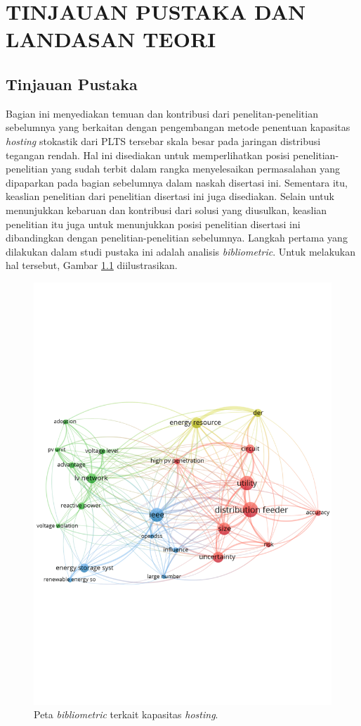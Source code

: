 \chapter{TINJAUAN PUSTAKA DAN LANDASAN TEORI}
\label{bab-tinjauan}
\section{Tinjauan Pustaka}
Bagian ini menyediakan temuan dan kontribusi dari penelitan-penelitian sebelumnya yang berkaitan dengan pengembangan metode penentuan kapasitas \textit{hosting} stokastik dari PLTS tersebar skala besar pada jaringan distribusi tegangan rendah. Hal ini disediakan untuk memperlihatkan posisi penelitian-penelitian yang sudah terbit dalam rangka menyelesaikan permasalahan yang dipaparkan pada bagian sebelumnya dalam naskah disertasi ini. Sementara itu, keaslian penelitian dari penelitian disertasi ini juga disediakan. Selain untuk menunjukkan kebaruan dan kontribusi dari solusi yang diusulkan, keaslian penelitian itu juga untuk menunjukkan posisi penelitian disertasi ini dibandingkan dengan penelitian-penelitian sebelumnya. Langkah pertama yang dilakukan dalam studi pustaka ini adalah analisis \textit{bibliometric}. Untuk melakukan hal tersebut, Gambar \ref{biblio} diilustrasikan. 
\begin{figure}[!h]
	\centering
	\includegraphics[width=1\textwidth]{Fig/biblio}
	\caption{Peta \textit{bibliometric} terkait kapasitas \textit{hosting}.}
	\label{biblio}
\end{figure}
